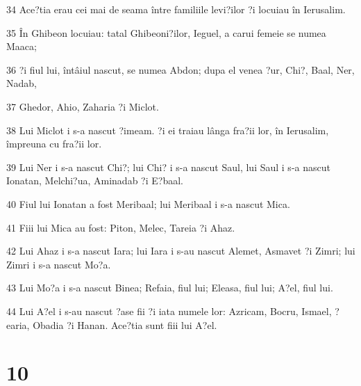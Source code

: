 \par 34 Ace?tia erau cei mai de seama între familiile levi?ilor ?i locuiau în Ierusalim.
\par 35 În Ghibeon locuiau: tatal Ghibeoni?ilor, Ieguel, a carui femeie se numea Maaca;
\par 36 ?i fiul lui, întâiul nascut, se numea Abdon; dupa el venea ?ur, Chi?, Baal, Ner, Nadab,
\par 37 Ghedor, Ahio, Zaharia ?i Miclot.
\par 38 Lui Miclot i s-a nascut ?imeam. ?i ei traiau lânga fra?ii lor, în Ierusalim, împreuna cu fra?ii lor.
\par 39 Lui Ner i s-a nascut Chi?; lui Chi? i s-a nascut Saul, lui Saul i s-a nascut Ionatan, Melchi?ua, Aminadab ?i E?baal.
\par 40 Fiul lui Ionatan a fost Meribaal; lui Meribaal i s-a nascut Mica.
\par 41 Fiii lui Mica au fost: Piton, Melec, Tareia ?i Ahaz.
\par 42 Lui Ahaz i s-a nascut Iara; lui Iara i s-au nascut Alemet, Asmavet ?i Zimri; lui Zimri i s-a nascut Mo?a.
\par 43 Lui Mo?a i s-a nascut Binea; Refaia, fiul lui; Eleasa, fiul lui; A?el, fiul lui.
\par 44 Lui A?el i s-au nascut ?ase fii ?i iata numele lor: Azricam, Bocru, Ismael, ?earia, Obadia ?i Hanan. Ace?tia sunt fiii lui A?el.

\chapter{10}

